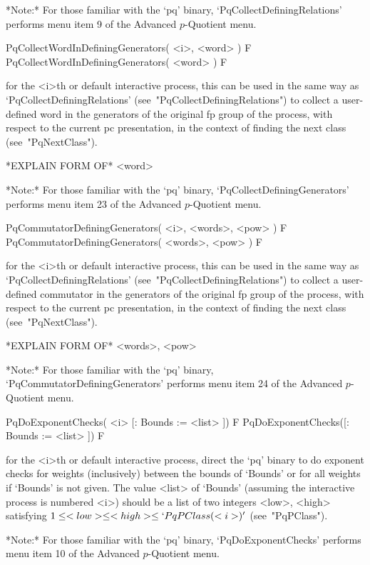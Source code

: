 *Note:*
For those familiar with  the  `pq'  binary,  `PqCollectDefiningRelations'
performs menu item 9 of the Advanced $p$-Quotient menu.

\>PqCollectWordInDefiningGenerators( <i>, <word> ) F
\>PqCollectWordInDefiningGenerators( <word> ) F

for the <i>th or default interactive {\ANUPQ} process, this can  be  used
in      the      same      way      as       `PqCollectDefiningRelations'
(see~"PqCollectDefiningRelations") to collect a user-defined word in  the
generators of the original fp group of the process, with respect  to  the
current pc presentation,  in  the  context  of  finding  the  next  class
(see~"PqNextClass").

*EXPLAIN FORM OF* <word>

*Note:*
For those familiar with the  `pq'  binary,  `PqCollectDefiningGenerators'
performs menu item 23 of the Advanced $p$-Quotient menu.

\>PqCommutatorDefiningGenerators( <i>, <words>, <pow> ) F
\>PqCommutatorDefiningGenerators( <words>, <pow> ) F

for the <i>th or default interactive {\ANUPQ} process, this can  be  used
in      the      same      way      as       `PqCollectDefiningRelations'
(see~"PqCollectDefiningRelations") to collect a  user-defined  commutator
in the generators of the original fp group of the process,  with  respect
to the current pc presentation, in the context of finding the next  class
(see~"PqNextClass").

*EXPLAIN FORM OF* <words>, <pow>

*Note:*
For those familiar with the `pq' binary, `PqCommutatorDefiningGenerators'
performs menu item 24 of the Advanced $p$-Quotient menu.

\>PqDoExponentChecks( <i> [: Bounds := <list> ]) F
\>PqDoExponentChecks([: Bounds := <list> ]) F

for the <i>th or default interactive {\ANUPQ} process, direct  the  `pq'
binary to do exponent checks for weights (inclusively) between the bounds
of `Bounds' or for all weights if `Bounds' is not given. The value <list>
of `Bounds' (assuming the interactive process is numbered <i>) should  be
a list of  two  integers  <low>,  <high>  satisfying  $1  \le  <low>  \le
<high> \le `PqPClass(<i>)'$ (see~"PqPClass").

*Note:*
For those familiar with the `pq'  binary,  `PqDoExponentChecks'  performs
menu item 10 of the Advanced $p$-Quotient menu.

